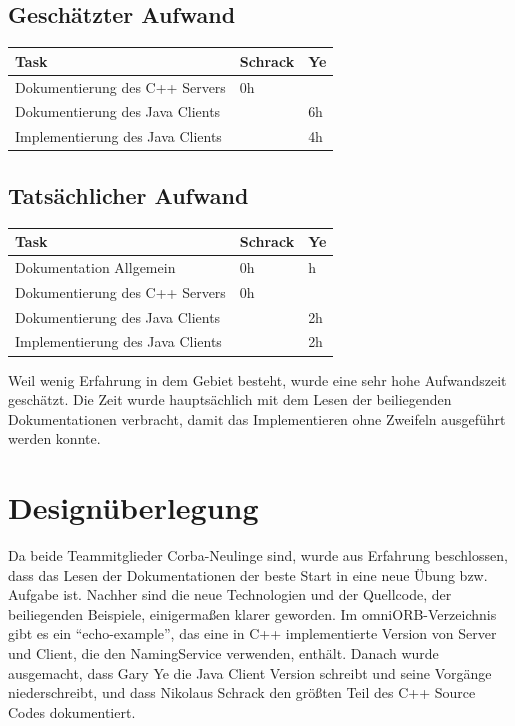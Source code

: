 \documentclass[11pt]{article}
\begin{document}
\subsection{Geschätzter Aufwand}

\begin{center}
  \begin{tabular}{| l | l | l |}
    \hline
    Task & Schrack & Ye \\ \hline

    Dokumentierung des C++ Servers   & 0h & \\ \hline
    Dokumentierung des Java Clients  & & 6h \\ \hline
    Implementierung des Java Clients & & 4h \\ \hline
  \end{tabular}
\end{center}

\subsection{Tatsächlicher Aufwand}
\begin{center}
  \begin{tabular}{| l | l | l |}
    \hline
    Task & Schrack & Ye \\ \hline
    Dokumentation Allgemein          & 0h & h \\ \hline
    Dokumentierung des C++ Servers   & 0h & \\ \hline
    Dokumentierung des Java Clients  & & 2h \\ \hline
    Implementierung des Java Clients & & 2h \\ \hline
  \end{tabular}
\end{center}

Weil wenig Erfahrung in dem Gebiet besteht, wurde eine sehr hohe Aufwandszeit geschätzt. Die Zeit wurde hauptsächlich mit dem Lesen der beiliegenden Dokumentationen \cite{omniorbuserguide} verbracht, damit das Implementieren ohne Zweifeln ausgeführt werden konnte.

\section{Designüberlegung}
Da beide Teammitglieder Corba-Neulinge sind, wurde aus Erfahrung beschlossen, dass das Lesen der Dokumentationen der beste Start in eine neue Übung bzw. Aufgabe ist. Nachher sind die neue Technologien und der Quellcode, der beiliegenden Beispiele, einigermaßen klarer geworden. Im omniORB-Verzeichnis gibt es ein ``echo-example'', das eine in C++ implementierte Version von Server und Client, die den NamingService verwenden, enthält. Danach wurde ausgemacht, dass Gary Ye die Java Client Version schreibt und seine Vorgänge niederschreibt, und dass Nikolaus Schrack den größten Teil des C++ Source Codes dokumentiert. 
\end{document}

